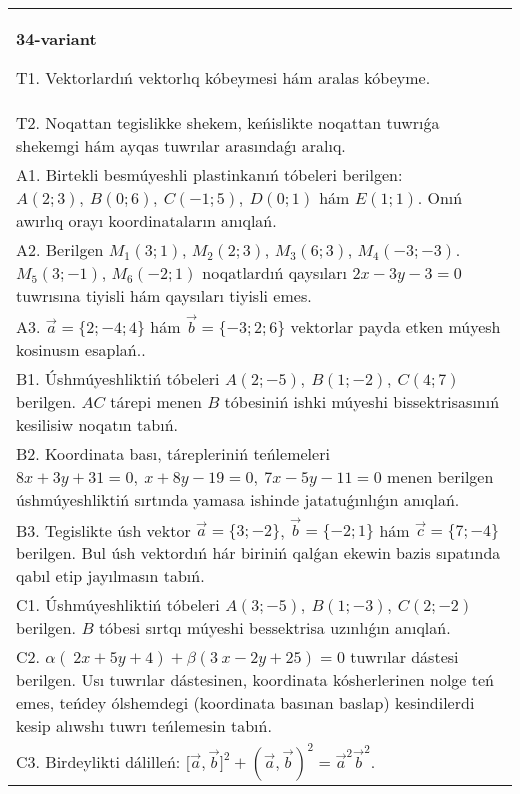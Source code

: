\documentclass{article}
\begin{document}
\begin{tabular}{m{17cm}}
\textbf{34-variant}
\newline

T1. 
Vektorlardıń vektorlıq kóbeymesi hám aralas kóbeyme.
 \\
T2. 
Noqattan tegislikke shekem, keńislikte noqattan tuwrıǵa shekemgi hám ayqas tuwrılar arasındaǵı aralıq. \\
A1. 
Birtekli besmúyeshli plastinkanıń tóbeleri berilgen:
$A(2;3), \ B(0;6), \ C(-1;5), \ D(0;1)$ hám $E(1;1)$. Onıń awırlıq
orayı koordinataların anıqlań.
 \\
A2. Berilgen $M_1 (3; 1) $, $M_2 (2; 3) $, $M_3 (6; 3) $,
$M_4 (-3;-3) $. $M_5 (3;-1) $, $M_6 (-2; 1) $ noqatlardıń qaysıları
$2x-3y-3 = 0$ tuwrısına tiyisli hám qaysıları tiyisli
emes.
 \\
A3. 
$\overrightarrow{a} = \{ 2; - 4;4\}$ hám $\overrightarrow{b} = \{ - 3;2;6\}$
vektorlar payda etken múyesh kosinusın esaplań.. 
 \\
B1. 
Úshmúyeshliktiń tóbeleri \(A(2;-5),\ B(1;-2),\ C(4;7)\)
berilgen. $AC$ tárepi menen $B$ tóbesiniń ishki múyeshi
bissektrisasınıń kesilisiw noqatın tabıń.
 \\
B2. 
Koordinata bası, tárepleriniń teńlemeleri
\(8x+3y+31=0,\ x+8y-19=0,\ 7x-5y-11=0\) menen
berilgen úshmúyeshliktiń sırtında yamasa ishinde jatatuǵınlıǵın anıqlań.
 \\
B3. Tegislikte úsh vektor $\vec{a} = \{ 3; - 2\}$, $\vec{b} = \{ - 2;1\}$ hám $\vec{c} = \{ 7; - 4\}$ berilgen. Bul úsh vektordıń hár biriniń qalǵan ekewin bazis sıpatında qabıl etip jayılmasın tabıń.
 \\
C1. 
Úshmúyeshliktiń tóbeleri
\(A(3; - 5),\ B(1; - 3),\ C(2; - 2)\) berilgen. $B$ tóbesi sırtqı
múyeshi bessektrisa uzınlıǵın anıqlań.
 \\
C2. 
\(\alpha (\ 2x + 5y + 4) + \beta(3\ x - 2y + 25) = 0\) tuwrılar
dástesi berilgen. Usı tuwrılar dástesinen, koordinata kósherlerinen
nolge teń emes, teńdey ólshemdegi (koordinata basınan baslap)
kesindilerdi kesip alıwshı tuwrı teńlemesin tabıń.
 \\
C3. 
Birdeylikti dálilleń: \(\lbrack\vec{a},\vec{b}\rbrack^{2} + (\vec{a},\vec{b}) ^{2} = {\vec{a}}^{2}{\vec{b}}^{2}\).
 \\

\end{tabular}
\vspace{1cm}
\end{document}

